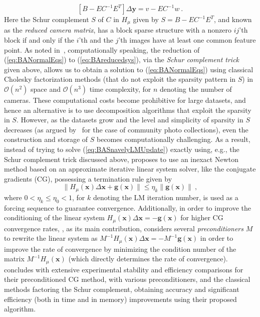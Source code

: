\documentclass[10pt]{article}
\begin{document}
\begin{equation}
\label{eq:BAreducedsys}
\left[B-EC^{-1}E^T\right]\Delta\mathbf{y} = v - EC^{-1}w \ .
\end{equation}
Here the Schur complement $S$ of $C$ in $H_{\mu}$ given by $S = B-EC^{-1}E^T$, and known as the \textit{reduced camera matrix}, has a block sparse structure with a nonzero $ij$'th block if and only if the $i$'th and the $j$'th images have at least one common feature point. As noted in~\cite{SnavelyBALarge}, computationally speaking, the reduction of (\ref{eq:BANormalEqs}) to (\ref{eq:BAreducedsys}), via the \textit{Schur complement trick} given above, allows us to obtain a solution to (\ref{eq:BANormalEqs}) using classical Cholesky factorization methods (that do not exploit the sparsity pattern in $S$) in $\mathcal{O}(n^2)$ space and $\mathcal{O}(n^3)$ time complexity, for $n$ denoting the number of cameras. These computational costs become prohibitive for large datasets, and hence an alternative is to use decomposition algorithms that exploit the sparsity in $S$. However, as the datasets grow and the level and simplicity of sparsity in $S$ decreases (as argued by~\cite{SnavelyBALarge} for the case of community photo collections), even the construction and storage of $S$ becomes computationally challenging. As a result, instead of trying to solve (\ref{eq:BASnavelyLMUpdate}) exactly using, e.g., the Schur complement trick discussed above, \cite{SnavelyBALarge} proposes to use an inexact Newton method based on an approximate iterative linear system solver, like the conjugate gradients (CG), possessing a termination rule given by
\begin{equation}
\label{eq:BATermRule}
\|H_{\mu}(\mathbf{x})\Delta\mathbf{x}  + \mathbf{g}(\mathbf{x})\|\leq\eta_k\|\mathbf{g}(\mathbf{x})\| \ ,
\end{equation}
where $0<\eta_k\leq\eta_0<1$, for $k$ denoting the LM iteration number, is used as a forcing sequence to guarantee convergence. Additionally, in order to improve the conditioning of the linear system $H_{\mu}(\mathbf{x})\Delta\mathbf{x} = -\mathbf{g}(\mathbf{x})$ for higher CG convergence rates, \cite{SnavelyBALarge}, as its main contribution, considers several \textit{preconditioners} $M$ to rewrite the linear system as $M^{-1}H_{\mu}(\mathbf{x})\Delta\mathbf{x} = -M^{-1}\mathbf{g}(\mathbf{x})$ in order to improve the rate of convergence by minimizing the condition number of the matrix $M^{-1}H_{\mu}(\mathbf{x})$ (which directly determines the rate of convergence). \cite{SnavelyBALarge} concludes with extensive experimental stability and efficiency comparisons for their preconditioned CG method, with various preconditioners, and the classical methods factoring the Schur complement, obtaining accuracy and significant efficiency (both in time and in memory) improvements using their proposed algorithm.
\end{document}

